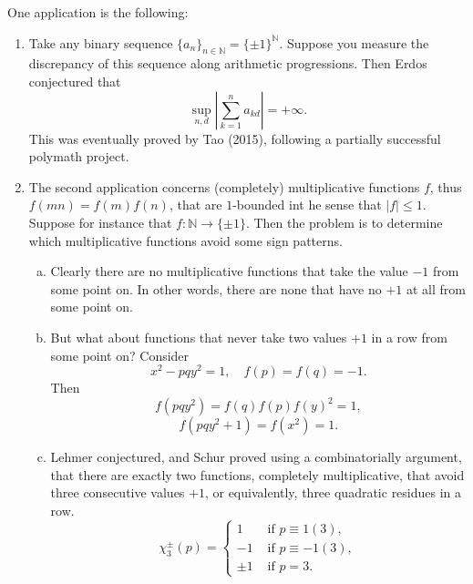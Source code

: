 \documentclass[reqno]{amsart} 
\begin{document}
One application is the following:
\begin{enumerate}
\item Take any binary sequence $\{a_n\}_{n \in \mathbb{N} } = \{\pm 1\}^{\mathbb{N} }$.  Suppose you measure the discrepancy of this sequence along arithmetic progressions.  Then Erdos conjectured that
  \begin{equation*}
    \sup_{n, d}
    \left\lvert
      \sum_{k = 1}^n a_{k d}
    \right\rvert
    =
    + \infty.
  \end{equation*}
  This was eventually proved by Tao (2015), following a partially successful polymath project.
\item The second application concerns (completely) multiplicative functions $f$, thus $f (m n) = f (m) f (n)$, that are $1$-bounded int he sense that $\lvert f \rvert \leq 1$.  Suppose for instance that $f : \mathbb{N} \rightarrow \{\pm 1\}$.  Then the problem is to determine which multiplicative functions avoid some sign patterns.
  \begin{enumerate}[(a)]
  \item Clearly there are no multiplicative functions that take the value $-1$ from some point on.  In other words, there are none that have no $+1$ at all from some point on.
  \item But what about functions that never take two values $+1$ in a row from some point on?  Consider
    \begin{equation*}
      x^2 - p q y^2 = 1, \quad f (p) = f (q ) = - 1.
    \end{equation*}
    Then
    \begin{equation*}
      f (p q y^2 ) = f (q ) f (p) f (y)^2 = 1,
    \end{equation*}
    \begin{equation*}
      f (p q y^2 + 1) = f (x^2 ) = 1.
    \end{equation*}
  \item Lehmer conjectured, and Schur proved using a combinatorially argument, that there are exactly two functions, completely multiplicative, that avoid three consecutive values $+1$, or equivalently, three quadratic residues in a row.
    \begin{equation*}
      \chi_3^{\pm} (p) =
      \begin{cases}
        1  &  \text{ if } p \equiv 1(3), \\
        -1 &  \text{ if } p \equiv -1(3), \\
        \pm 1 &  \text{ if } p = 3.
      \end{cases}

\end{equation*}
\end{enumerate}
\end{enumerate}
\end{document}
